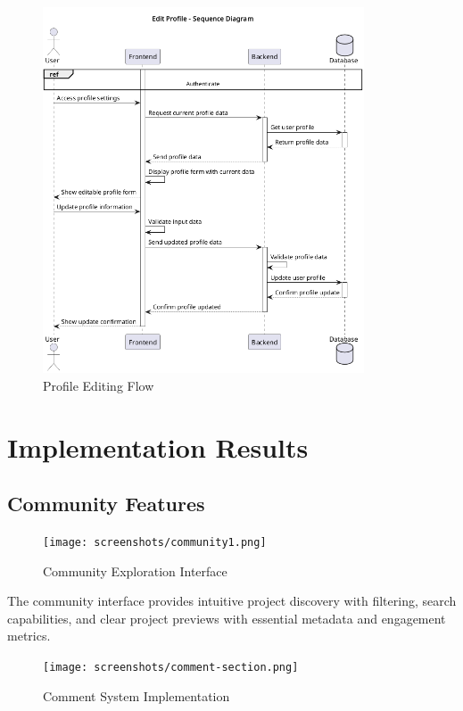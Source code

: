 \begin{figure}[H]
\centering
\includegraphics[width=0.85\textwidth]{conception/SprintV/sequence_diagrams/sequence_profileManagement_7_1_EditUserProfile.png}
\caption{Profile Editing Flow}
\label{fig:seq_edit_profile}
\end{figure}

\section{Implementation Results}

\subsection{Community Features}

\begin{figure}[H]
\centering
\texttt{[image: screenshots/community1.png]}
\caption{Community Exploration Interface}
\label{fig:community_main}
\end{figure}

The community interface provides intuitive project discovery with filtering, search capabilities, and clear project previews with essential metadata and engagement metrics.

\begin{figure}[H]
\centering
\texttt{[image: screenshots/comment-section.png]}
\caption{Comment System Implementation}
\label{fig:comment_section}
\end{figure}

